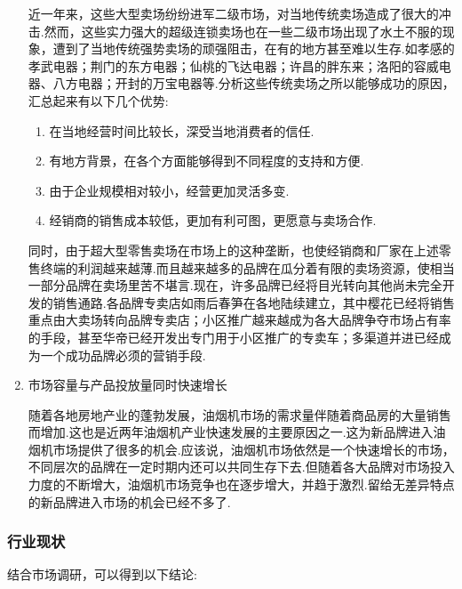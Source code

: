 \begin{enumerate}
      近一年来，这些大型卖场纷纷进军二级市场，对当地传统卖场造成了很大的冲击.然而，这些实力强大的超级连锁卖场也在一些二级市场出现了水土不服的现象，遭到了当地传统强势卖场的顽强阻击，在有的地方甚至难以生存.如孝感的孝武电器；荆门的东方电器；仙桃的飞达电器；许昌的胖东来；洛阳的容威电器、八方电器；开封的万宝电器等.分析这些传统卖场之所以能够成功的原因，汇总起来有以下几个优势:

      \begin{enumerate}[(1)]
      \item 在当地经营时间比较长，深受当地消费者的信任.
      \item 有地方背景，在各个方面能够得到不同程度的支持和方便.
      \item 由于企业规模相对较小，经营更加灵活多变.
      \item 经销商的销售成本较低，更加有利可图，更愿意与卖场合作.
      \end{enumerate}

      同时，由于超大型零售卖场在市场上的这种垄断，也使经销商和厂家在上述零售终端的利润越来越薄.而且越来越多的品牌在瓜分着有限的卖场资源，使相当一部分品牌在卖场里苦不堪言.现在，许多品牌已经将目光转向其他尚未完全开发的销售通路.各品牌专卖店如雨后春笋在各地陆续建立，其中樱花已经将销售重点由大卖场转向品牌专卖店；小区推广越来越成为各大品牌争夺市场占有率的手段，甚至华帝已经开发出专门用于小区推广的专卖车；多渠道并进已经成为一个成功品牌必须的营销手段.

\item 市场容量与产品投放量同时快速增长

      随着各地房地产业的蓬勃发展，油烟机市场的需求量伴随着商品房的大量销售而增加.这也是近两年油烟机产业快速发展的主要原因之一.这为新品牌进入油烟机市场提供了很多的机会.应该说，油烟机市场依然是一个快速增长的市场，不同层次的品牌在一定时期内还可以共同生存下去.但随着各大品牌对市场投入力度的不断增大，油烟机市场竞争也在逐步增大，并趋于激烈.留给无差异特点的新品牌进入市场的机会已经不多了.

\end{enumerate}

\subsubsection{行业现状}
结合市场调研，可以得到以下结论:

